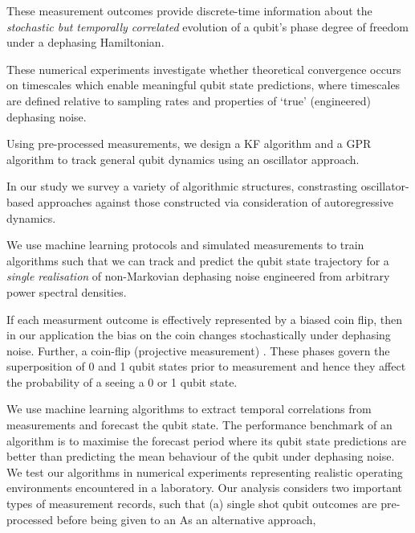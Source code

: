 \documentclass[pra, reprint]{revtex4-1}
\begin{document}
\iffalse
These measurement outcomes provide discrete-time information about the \emph{stochastic but temporally correlated} evolution of a qubit's phase degree of freedom under a dephasing Hamiltonian. 

These numerical experiments investigate whether theoretical convergence occurs on timescales which enable meaningful qubit state predictions, where timescales are defined relative to sampling rates and properties of `true' (engineered) dephasing noise. 

 Using pre-processed measurements, we design a KF algorithm and a GPR algorithm to track general qubit dynamics using an oscillator approach. 
 
 In our study we survey a variety of algorithmic structures, constrasting oscillator-based approaches against those constructed via consideration of autoregressive dynamics. 
 
 We use machine learning protocols and simulated measurements to train algorithms such that we can track and predict the qubit state trajectory for a \textit{single realisation} of non-Markovian dephasing noise engineered from arbitrary power spectral densities.
  
  If each measurment outcome is effectively represented by a biased coin flip, then in our application the bias on the coin changes stochastically under dephasing noise. Further, a coin-flip (projective measurement) . These phases govern the superposition of 0 and 1 qubit states prior to measurement and hence they affect the probability of a seeing a 0 or 1 qubit state. 
 
 We use machine learning algorithms to extract temporal correlations from measurements and forecast the qubit state. The performance benchmark of an algorithm is to maximise the forecast period where its qubit state predictions are better than predicting the mean behaviour of the qubit under dephasing noise. We test our algorithms in numerical experiments representing realistic operating environments encountered in a laboratory. Our analysis considers two important types of measurement records, such that (a) single shot qubit outcomes are pre-processed before being given to an 
As an alternative approach, 
\end{document}
